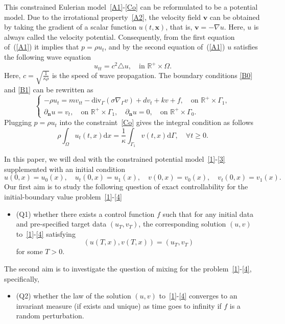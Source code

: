 \documentclass[10pt]{elsarticle}
\begin{document}
This constrained Eulerian model~\eqref{A1}-\eqref{Co} can be reformulated to be a potential model. Due to the irrotational property~\eqref{A2}, the velocity field $\mathbf{v}$ can be obtained by taking the gradient of a scalar function $u(t, \mathbf{x})$, that is, $\mathbf{v}=-\nabla u$. Here, $u$ is always called the velocity potential. Consequently, from the first equation of~(\ref{A1}) it implies that $p=\rho u_t$, and by the second equation of~(\ref{A1}) $u$ satisfies the following wave equation
\begin{equation}
	 u_{tt} = c^2\triangle u, \quad \textrm{in $\mathbb{R}^{+} \times \Omega$.} \label{1}
\end{equation}
Here, $c=\sqrt{\frac{1}{\kappa\rho}}$ is the speed of wave propagation. The boundary conditions \eqref{B0} and \eqref{B1} can be rewritten as
\begin{equation} \label{2}
\left
    \{
        \begin{array}{ll}
            -\rho u_t= m v_{tt} - \mathrm{div}_{\Gamma}\left(\sigma\nabla_{\Gamma} v\right) + d v_t + k v + f, \quad \textrm{on $\mathbb{R}^{+} \times \Gamma_1$},\\ 
            \partial_{\mathbf{n}}u =v_t, \quad \textrm{on $\mathbb{R}^{+} \times \Gamma_1$}, \quad \partial_{\mathbf{n}}u = 0, \quad \textrm{on $\mathbb{R}^{+} \times \Gamma_0$}.
        \end{array} 
\right. 
\end{equation}
Plugging $p=\rho u_t$ into the constraint~\eqref{Co} gives the integral condition as follows
\begin{equation}\label{3}
\rho\int_{\Omega}u_t(t, x)\mathrm{d}x = \frac{1}{\kappa}\int_{\Gamma_1}v(t, x)\mathrm{d}\Gamma,  \quad \forall t\geqslant 0.
\end{equation}

In this paper, we will deal with the constrained potential model~\eqref{1}-\eqref{3} supplemented with an initial condition 
\begin{equation}\label{4}
u(0, x)=u_0(x),\quad u_t(0, x)=u_1(x),\quad v(0, x)=v_0(x),\quad v_t(0, x)=v_1(x). 
\end{equation}
Our first aim is to study the following question of exact controllability for the initial-boundary value problem~\eqref{1}-\eqref{4}
\begin{itemize}
\item (Q1) whether there exists a control function $f$ such that for any initial data and pre-specified target data $(u_{T}, v_{T})$, the corresponding solution $(u, v)$ to~\eqref{1}-\eqref{4} satisfying
\[
\left(u(T, x), v(T, x)\right) = (u_{T}, v_{T})
\]
for some $T>0$.
\end{itemize}
The second aim is to investigate the question of mixing for the problem~\eqref{1}-\eqref{4}, specifically,
\begin{itemize}
\item (Q2) whether the law of the solution $(u, v)$ to~\eqref{1}-\eqref{4} converges to an invariant measure (if exists and unique) as time goes to infinity if $f$ is a random perturbation.
\end{itemize}
\end{document}
